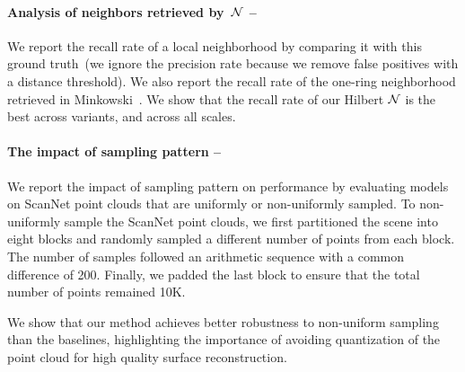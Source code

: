 
\paragraph{Analysis of neighbors retrieved by~$\mathcal{N}$ -- }
We report the recall rate of a local neighborhood by comparing it with this ground truth~(we ignore the precision rate because we remove false positives with a distance threshold).
We also report the recall rate of the one-ring neighborhood retrieved in Minkowski~\cite{choy20194d}.
We show that the recall rate of our Hilbert $\mathcal{N}$ is the best across variants, and across all scales.


\paragraph{The impact of sampling pattern --~} 
We report the impact of sampling pattern on performance by evaluating models on ScanNet point clouds that are uniformly or non-uniformly sampled. 
{To non-uniformly sample the ScanNet point clouds, we first partitioned the scene into eight blocks and randomly sampled a different number of points from each block. The number of samples followed an arithmetic sequence with a common difference of 200. Finally, we padded the last block to ensure that the total number of points remained 10K.}
 
We show that our method achieves better robustness to non-uniform sampling than the baselines, highlighting the importance of avoiding quantization of the point cloud for high quality surface reconstruction. 

